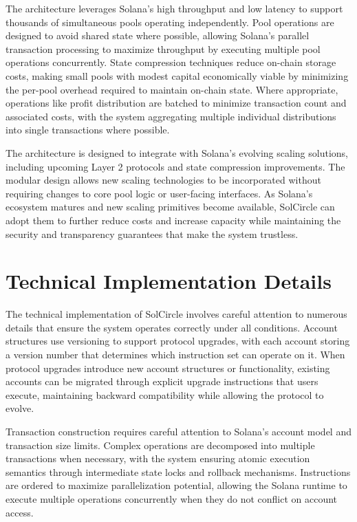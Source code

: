 \documentclass[11pt,a4paper]{article}
\begin{document}
The architecture leverages Solana's high throughput and low latency to support thousands of simultaneous pools operating independently. Pool operations are designed to avoid shared state where possible, allowing Solana's parallel transaction processing to maximize throughput by executing multiple pool operations concurrently. State compression techniques reduce on-chain storage costs, making small pools with modest capital economically viable by minimizing the per-pool overhead required to maintain on-chain state. Where appropriate, operations like profit distribution are batched to minimize transaction count and associated costs, with the system aggregating multiple individual distributions into single transactions where possible.

The architecture is designed to integrate with Solana's evolving scaling solutions, including upcoming Layer 2 protocols and state compression improvements. The modular design allows new scaling technologies to be incorporated without requiring changes to core pool logic or user-facing interfaces. As Solana's ecosystem matures and new scaling primitives become available, SolCircle can adopt them to further reduce costs and increase capacity while maintaining the security and transparency guarantees that make the system trustless.

\section{Technical Implementation Details}

The technical implementation of SolCircle involves careful attention to numerous details that ensure the system operates correctly under all conditions. Account structures use versioning to support protocol upgrades, with each account storing a version number that determines which instruction set can operate on it. When protocol upgrades introduce new account structures or functionality, existing accounts can be migrated through explicit upgrade instructions that users execute, maintaining backward compatibility while allowing the protocol to evolve.

Transaction construction requires careful attention to Solana's account model and transaction size limits. Complex operations are decomposed into multiple transactions when necessary, with the system ensuring atomic execution semantics through intermediate state locks and rollback mechanisms. Instructions are ordered to maximize parallelization potential, allowing the Solana runtime to execute multiple operations concurrently when they do not conflict on account access.
\end{document}
